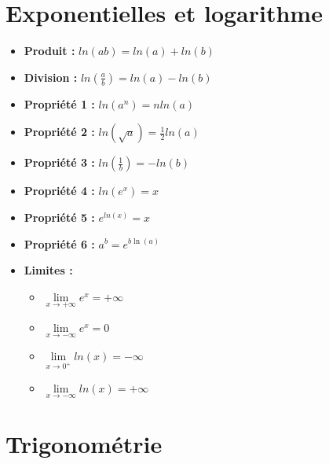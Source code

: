 \documentclass[12]{article}%
\theoremstyle{plain}
\theoremstyle{definition}
\theoremstyle{remark}
\begin{document}
\section{Exponentielles et logarithme}
\large
\begin{itemize}
	\item \textbf{Produit :} \( \boxed{ln(ab) = ln(a) + ln(b)} \)
	\item \textbf{Division :} \( \boxed{ln\left (\frac{a}{b}\right ) = ln(a) - ln(b)} \)
	\item \textbf{Propriété 1 :} \( \boxed{ln(a^{n}) = nln(a)} \)
	\item \textbf{Propriété 2 :} \( \boxed{ln\left (\sqrt{a}\right ) = \frac{1}{2}ln(a)} \)
	\item \textbf{Propriété 3 :} \( \boxed{ln\left (\frac{1}{b}\right ) = -ln(b)} \)
	\item \textbf{Propriété 4 :} \( \boxed{ln(e^{x}) = x} \)
	\item \textbf{Propriété 5 :} \( \boxed{e^{ln(x)} = x} \)
	\item \textbf{Propriété 6 :} \( \boxed{a^{b} = e^{b\ln(a)}} \)
	\item \textbf{Limites :}
	\begin{itemize}
		\item \( \boxed{\lim\limits_{x \to +\infty} e^{x} = +\infty} \)
		\item \( \boxed{\lim\limits_{x \to -\infty} e^{x} = 0} \)
		
		\item \( \boxed{\lim\limits_{x \to 0^{+}} ln(x) = -\infty} \)
		\item \( \boxed{\lim\limits_{x \to -\infty} ln(x) = +\infty} \)
	\end{itemize}
\end{itemize}

\newpage
\section{Trigonométrie}
\end{document}
